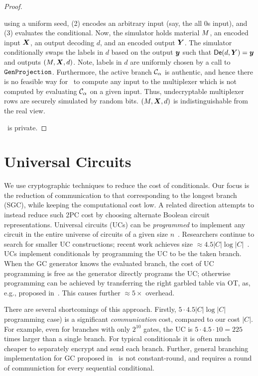 \begin{proof}
\begin{itemize}
      using a uniform seed, (2) encodes an arbitrary input (say, the
      all 0s input), and (3) evaluates the conditional.
      Now, the simulator holds material $M$, an encoded input
      $\gcirinp$, an output decoding $d$, and an encoded output
      $\gcirout$.
      The simulator conditionally swaps the labels in $d$ based on the
      output $\cirout$ such that $\gDe(d, \gcirout) = \cirout$ and
      outputs $(\mat, \gcirinp, d)$.
      Note, labels in $d$ are uniformly chosen by a call to
      $\mathtt{GenProjection}$.
      Furthermore, the active branch $\mathcal C_{\alpha}$ is authentic, and
      hence there is no feasible way for \adv\ to compute any input to
      the multiplexer which is
      not computed by evaluating $\mathcal C_{\alpha}$ on a given input.
      Thus, undecryptable multiplexer rows are securely simulated by
      random bits.
      $(\mat, \gcirinp, d)$ is indistinguishable from the real view.
  \end{itemize}
  \ourschemelong\ is private.
\end{proof}

\section{Universal Circuits}
We use cryptographic techniques to reduce the cost of conditionals.
Our focus is the reduction of communication to that corresponding to
the longest branch (SGC), while keeping the computational cost low.
A related direction attempts to instead reduce such 2PC cost by
choosing alternate Boolean circuit representations.  Universal
circuits (UCs) can be \emph{programmed} to implement any circuit in
the entire universe of circuits of a given size
$n$~\cite{STOC:Valiant76}.  Researchers continue to search for smaller
UC constructions; recent work achieves size $\approx 4.5 |C| \log
|C|$~\cite{EPRINT:LipMohSad16,EC:KisSch16,AC:GunKisSch17,AC:ZYZL19,JC:AGKS20}.
%
UCs implement conditionals by programming the UC to be the taken
branch.  When the GC generator knows the evaluated branch, the cost of
UC programming is free as the generator directly programs the UC;
otherwise programming can be achieved by transferring the right
garbled table via OT, as, e.g., proposed in~\cite{AC:KenKolWil17}.
This causes further $\approx 5\times$ overhead.

There are several shortcomings of this approach.  Firstly,  $5\cdot
4.5 |C| \log |C|$ %
programming case) is a significant {\em communication} cost, compared
to our cost $|C|$.  For example, even for branches with only $2^{10}$
gates, the UC is $5 \cdot 4.5 \cdot 10 = 225$ times larger than a
single branch.  For typical conditionals it is often much cheaper to
separately encrypt and send each branch.  Further, general branching
implementation for GC proposed in~\cite{AC:KenKolWil17} is not
constant-round, and requires a round of communiction for every
sequential conditional.


